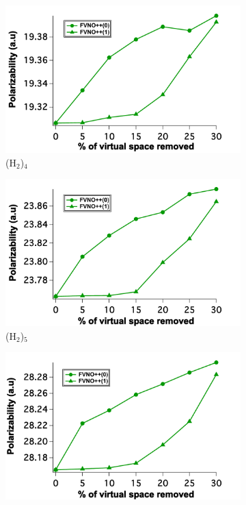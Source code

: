 \begin{figure}
\begin{subfigure}{.5\textwidth}
  \centering
  \includegraphics[width=.9\linewidth]{figures_fvno++/fvno++_cc2_1_h2_4_adz_polar.pdf}
  \caption{(H$_2$)$_4$}
  \label{fig:sfig1}
\end{subfigure}%
\begin{subfigure}{.5\textwidth}
  \centering
  \includegraphics[width=.9\linewidth]{figures_fvno++/fvno++_cc2_1_h2_5_adz_polar.pdf}
  \caption{(H$_2$)$_5$}
  \label{fig:sfig2}
\end{subfigure}
\begin{subfigure}{.5\textwidth}
  \centering
  \includegraphics[width=.9\linewidth]{figures_fvno++/fvno++_cc2_1_h2_6_adz_polar.pdf}

\end{subfigure}
\end{figure}

